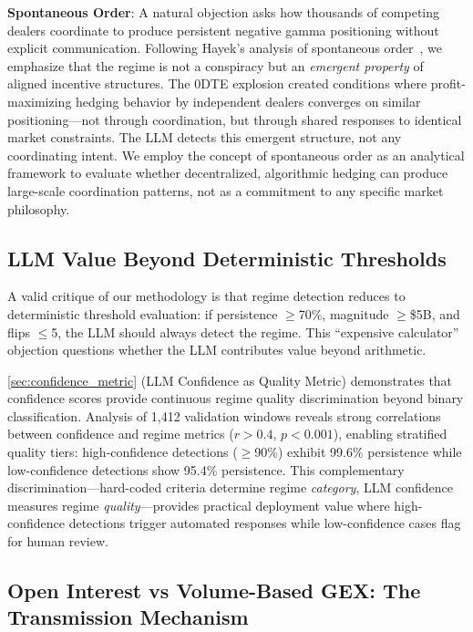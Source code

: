 \noindent\textbf{Spontaneous Order}: A natural objection asks how thousands of competing dealers coordinate to produce persistent negative gamma positioning without explicit communication. Following Hayek's analysis of spontaneous order~\cite{hayek1945}, we emphasize that the regime is not a conspiracy but an \textit{emergent property} of aligned incentive structures. The 0DTE explosion created conditions where profit-maximizing hedging behavior by independent dealers converges on similar positioning---not through coordination, but through shared responses to identical market constraints. The LLM detects this emergent structure, not any coordinating intent. We employ the concept of spontaneous order as an analytical framework to evaluate whether decentralized, algorithmic hedging can produce large-scale coordination patterns, not as a commitment to any specific market philosophy.

\subsection{LLM Value Beyond Deterministic Thresholds}

\vspace{0.2cm}

A valid critique of our methodology is that regime detection reduces to deterministic threshold evaluation: if persistence $\geq$70\%, magnitude $\geq$\$5B, and flips $\leq$5, the LLM should always detect the regime. This ``expensive calculator'' objection questions whether the LLM contributes value beyond arithmetic.

\vspace{0.2cm}

\ref{sec:confidence_metric} (LLM Confidence as Quality Metric) demonstrates that confidence scores provide continuous regime quality discrimination beyond binary classification. Analysis of 1,412 validation windows reveals strong correlations between confidence and regime metrics ($r > 0.4$, $p < 0.001$), enabling stratified quality tiers: high-confidence detections ($\geq$90\%) exhibit 99.6\% persistence while low-confidence detections show 95.4\% persistence. This complementary discrimination—hard-coded criteria determine regime \textit{category}, LLM confidence measures regime \textit{quality}—provides practical deployment value where high-confidence detections trigger automated responses while low-confidence cases flag for human review.

\subsection{Open Interest vs Volume-Based GEX: The Transmission Mechanism}

